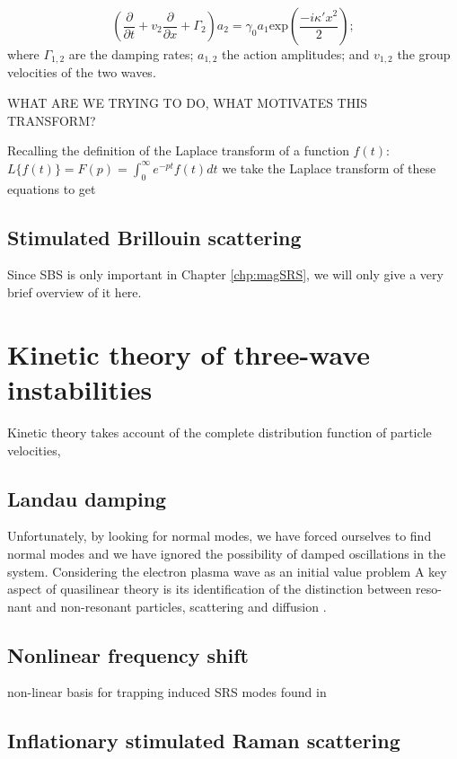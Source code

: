 \begin{equation}
 \left(\frac{\partial}{\partial t} + v_2\frac{\partial}{\partial x} + \Gamma_2 \right)a_2 = \gamma_0a_1\text{exp}\left(\frac{-i\kappa'x^2}{2}\right);
\end{equation} 
where $\Gamma_{1,2}$ are the damping rates; $a_{1,2}$ the action amplitudes; and $v_{1,2}$ the group velocities of the two waves. 

WHAT ARE WE TRYING TO DO, WHAT MOTIVATES THIS TRANSFORM?

Recalling the definition of the Laplace transform of a function $f(t)$: $L\{f(t)\}= F(p) = \int_0^\infty e^{-pt} f(t) dt$ we take the Laplace transform of these equations to get






\subsection{Stimulated Brillouin scattering}
Since SBS is only important in Chapter \ref{chp:magSRS}, we will only give a very brief overview of it here.


\section{Kinetic theory of three-wave instabilities}

Kinetic theory takes account of the complete distribution function of particle velocities, 

\subsection{Landau damping}


Unfortunately, by looking for normal modes, we have forced ourselves to find normal modes and we have ignored the possibility of damped oscillations in the system. Considering the electron plasma wave as an initial value problem 
A key aspect of quasilinear theory is its identification of the distinction between reso-
nant and non-resonant particles, scattering and diffusion \citep{Sagdeev2018}.

\subsection{Nonlinear frequency shift}
non-linear basis for trapping induced SRS modes found in \cite{Rose2001}


\subsection{Inflationary stimulated Raman scattering}


